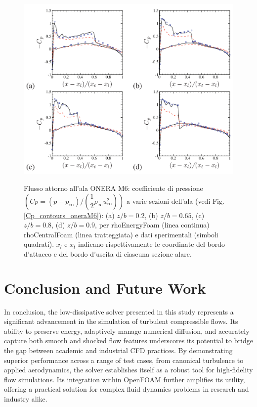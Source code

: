 \documentclass[a5paper]{sapthesis}
\begin{document}
	\begin{figure}[htp]
		\begin{center}
			{\includegraphics[width=0.95\linewidth]{Figures/Cp_oneram6}}  
			\caption{Flusso attorno all'ala ONERA M6: coefficiente di pressione $(Cp = (p-p_\infty)/(\dfrac{1}{2}\rho_\infty u^2_\infty))$ a varie sezioni dell'ala (vedi Fig. \ref{Cp_contours_oneraM6}): (a) $z/b = 0.2$, (b) $z/b = 0.65$, (c) $z/b = 0.8$, (d) $z/b = 0.9$, per rhoEnergyFoam (linea continua) rhoCentralFoam (linea tratteggiata) e dati sperimentali (simboli quadrati). $x_l$ e $x_t$ indicano rispettivamente le coordinate del bordo d'attacco e del bordo d'uscita di ciascuna sezione alare.}
			\label{Cp_oneraM6}
		\end{center}
	\end{figure}

	\chapter{Conclusion and Future Work}
	\label{chap:conclusion}
	
	In conclusion, the low-dissipative solver presented in this study represents a significant advancement in the simulation of turbulent compressible flows. Its ability to preserve energy, adaptively manage numerical diffusion, and accurately capture both smooth and shocked flow features underscores its potential to bridge the gap between academic and industrial CFD practices. By demonstrating superior performance across a range of test cases, from canonical turbulence to applied aerodynamics, the solver establishes itself as a robust tool for high-fidelity flow simulations. Its integration within OpenFOAM further amplifies its utility, offering a practical solution for complex fluid dynamics problems in research and industry alike.
	

	\cleardoublepage
	
\end{document}
